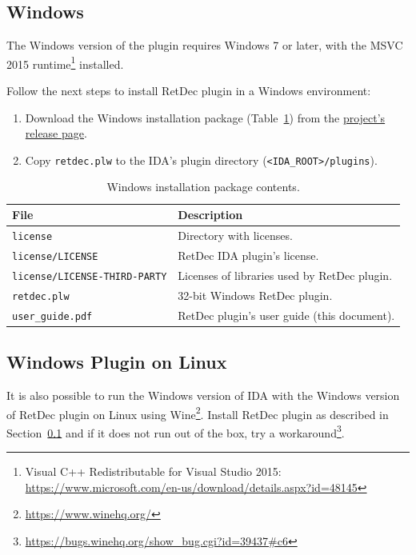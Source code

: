 \documentclass[pdftex, a4paper,12pt, oneside, svgnames]{article}
\begin{document}
\subsection{Windows}
\label{sec:installation:windows}
The Windows version of the plugin requires Windows 7 or later, with the MSVC 2015 runtime\footnote{Visual C++ Redistributable for Visual Studio 2015: \url{https://www.microsoft.com/en-us/download/details.aspx?id=48145}} installed.

Follow the next steps to install RetDec plugin in a Windows environment:
\begin{enumerate}
	\item Download the Windows installation package (Table~\ref{table:installation-package-windows}) from the \href{https://github.com/avast-tl/retdec-idaplugin/releases}{project's release page}.
	\item Copy \texttt{retdec.plw} to the IDA's plugin directory (\texttt{<IDA\_ROOT>/plugins}).
\end{enumerate}

\begin{table}[!ht]
\centering
\caption{Windows installation package contents.}
\label{table:installation-package-windows}
\begin{tabular}{ll}
\textbf{File} & \textbf{Description}\\
\hline
\texttt{license} & Directory with licenses. \\
\texttt{license/LICENSE} & RetDec IDA plugin's license. \\
\texttt{license/LICENSE-THIRD-PARTY} & Licenses of libraries used by RetDec plugin. \\
\texttt{retdec.plw} & 32-bit Windows RetDec plugin. \\
\texttt{user_guide.pdf} & RetDec plugin's user guide (this document). \\
\end{tabular}
\end{table}

\subsection{Windows Plugin on Linux}
It is also possible to run the Windows version of IDA with the Windows version of RetDec plugin on Linux using Wine\footnote{\url{https://www.winehq.org/}}. Install RetDec plugin as described in Section~\ref{sec:installation:windows} and if it does not run out of the box, try a workaround\footnote{\url{https://bugs.winehq.org/show_bug.cgi?id=39437\#c6}}.
\end{document}
